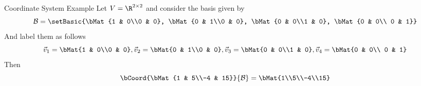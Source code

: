\documentclass[xcoler=dvipsnames, aspectratio=169]{beamer}
\newcommand{\B}{\mathcal{B}}
\begin{document}
    \begin{frame}{Coordinate System Example}
        Let $V=\R^{2\times 2}$ and consider the basis given by
        \[
            \B = \setBasic{\bMat{1 & 0\\0 & 0}, \bMat{0 & 1\\0 & 0}, \bMat{0 & 0\\1 & 0}, \bMat{0 & 0\\
            0 & 1}}
        \]
        And label them as follows
        \[
            \vec{v}_1 = \bMat{1 & 0\\0 & 0},\vec{v}_2 = \bMat{0 & 1\\0 & 0},
            \vec{v}_3 =\bMat{0 & 0\\1 & 0} ,\vec{v}_4 = \bMat{0 & 0\\ 0 & 1}
        \]
        Then
        \[
            \bCoord{\bMat{1 & 5\\-4 & 15}}{\B} = \bMat{1\\5\\-4\\15}
        \]
    \end{frame}
\end{document}
